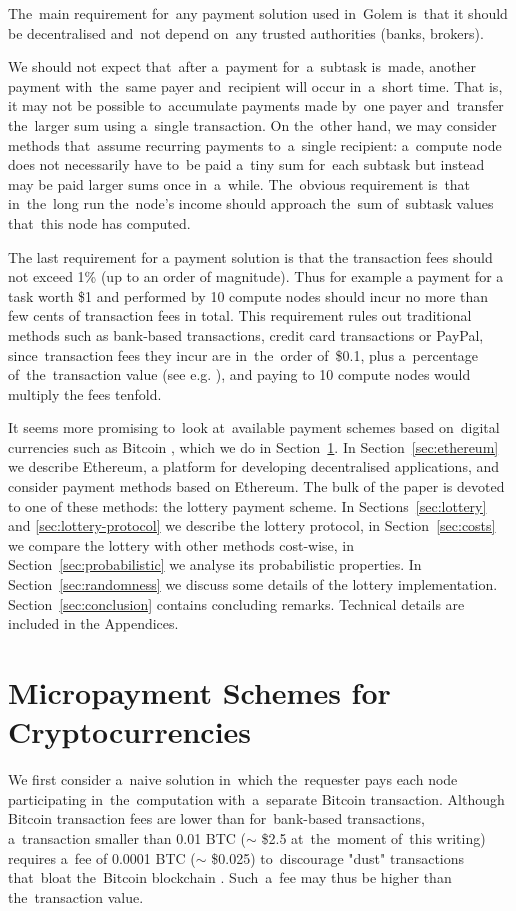 \documentclass[a4paper]{article}
\newcommand{\BTC}{BTC}%
\begin{document}
    The~main requirement for~any payment solution used in~Golem  is~that it should be decentralised and~not depend
    on~any trusted authorities (banks, brokers).

    We should not expect that~after a~payment for~a~subtask  is~made, another payment with~the~same payer and~recipient
    will occur in~a~short time. That is, it may not be possible to~accumulate payments made by~one payer and~transfer
    the~larger sum using a~single transaction. On the~other hand, we may consider methods that~assume recurring
    payments to~a~single recipient: a~compute node does not necessarily have to~be paid a~tiny sum for~each
    subtask but instead may be paid larger sums once in~a~while. The~obvious requirement  is~that in~the~long run
    the~node's income should approach the~sum of~subtask values that~this node has computed.

    The last requirement for a payment solution is that the transaction fees should not exceed 1\% (up to an order of
    magnitude). Thus for example a payment for a task worth \$1 and performed by 10 compute nodes should incur no more than 
    few cents of transaction fees in total. This requirement rules out traditional methods such as bank-based
    transactions, credit card transactions or PayPal, since~transaction fees they incur are in~the~order of~\$0.1,
    plus a~percentage of~the~transaction value (see e.g. \cite{FRS}), and paying to 10 compute nodes would multiply the fees
    tenfold.

    It seems more promising to~look at~available payment schemes based on~digital currencies such
    as Bitcoin \cite{BITCOIN}, which we do in Section~\ref{sec:cryptocurrencies}. In Section~\ref{sec:ethereum} we
    describe Ethereum, a platform for developing decentralised applications, and consider payment methods based
    on Ethereum. The bulk of the paper is devoted to one of these methods: the lottery payment scheme.
    In Sections~\ref{sec:lottery} and \ref{sec:lottery-protocol} we describe the lottery protocol, in Section~\ref{sec:costs}
    we compare the lottery with other methods cost-wise, in Section~\ref{sec:probabilistic} we analyse its
    probabilistic properties. In Section~\ref{sec:randomness} we discuss some details of the lottery implementation.
    Section~\ref{sec:conclusion} contains concluding remarks. Technical details are included in the Appendices.

\section{Micropayment Schemes for Cryptocurrencies}
\label{sec:cryptocurrencies}    
    We first consider a~naive solution in~which the~requester pays each node participating in~the~computation
    with~a~separate Bitcoin transaction. Although Bitcoin transaction fees are lower than for~bank-based transactions,
    a~transaction smaller than 0.01 \BTC{} ($\sim$ \$2.5 at~the~moment of~this writing) requires a~fee of
    0.0001 \BTC{} ($\sim$ \$0.025) to~discourage "dust" transactions that~bloat the~Bitcoin blockchain \cite{BITFEE}.
    Such~a~fee may thus be higher than the~transaction value.
\end{document}
